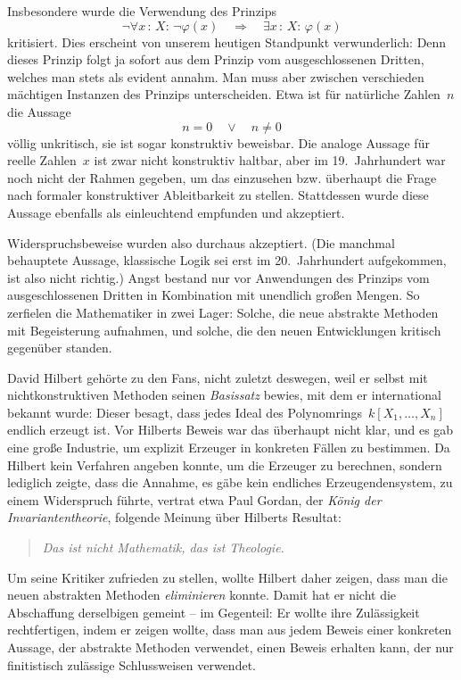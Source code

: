 \documentclass[a4paper,ngerman,12pt]{scrartcl}
\theoremstyle{definition}
\theoremstyle{plain}
\theoremstyle{remark}
\renewcommand{\_}{\mathpunct{.}\,}
\newcommand{\?}{\,{:}\,}
\begin{document}
Insbesondere wurde die Verwendung des Prinzips
\[ \neg\forall x\?X{:}\, \neg\varphi(x) \quad\Longrightarrow\quad
  \exists x\?X{:}\, \varphi(x) \]
kritisiert. Dies erscheint von unserem heutigen Standpunkt verwunderlich: Denn
dieses Prinzip folgt ja sofort aus dem Prinzip vom ausgeschlossenen Dritten,
welches man stets als evident annahm. Man muss aber zwischen verschieden
mächtigen Instanzen des Prinzips unterscheiden. Etwa ist für natürliche
Zahlen~$n$ die Aussage
\[ n = 0 \quad\vee\quad n \neq 0 \]
völlig unkritisch, sie ist sogar konstruktiv beweisbar. Die analoge Aussage für
reelle Zahlen~$x$ ist zwar nicht konstruktiv haltbar, aber im 19.~Jahrhundert
war noch nicht der Rahmen gegeben, um das einzusehen bzw. überhaupt die Frage
nach formaler konstruktiver Ableitbarkeit zu stellen. Stattdessen wurde diese
Aussage ebenfalls als einleuchtend empfunden und akzeptiert.

Widerspruchsbeweise wurden also durchaus akzeptiert. (Die manchmal behauptete
Aussage, klassische Logik sei erst im 20.~Jahrhundert aufgekommen, ist also
nicht richtig.) Angst bestand nur vor Anwendungen des Prinzips vom
ausgeschlossenen Dritten in Kombination mit unendlich großen Mengen. So
zerfielen die Mathematiker in zwei Lager: Solche, die neue abstrakte Methoden
mit Begeisterung aufnahmen, und solche, die den neuen Entwicklungen kritisch
gegenüber standen.

David Hilbert gehörte zu den Fans, nicht zuletzt deswegen, weil er selbst mit
nichtkonstruktiven Methoden seinen \emph{Basissatz} bewies, mit dem er
international bekannt wurde: Dieser besagt, dass jedes Ideal des
Polynomrings~$k[X_1,\ldots,X_n]$ endlich erzeugt ist. Vor Hilberts Beweis war
das überhaupt nicht klar, und es gab eine große Industrie, um explizit Erzeuger in
konkreten Fällen zu bestimmen. Da Hilbert kein Verfahren angeben konnte,
um die Erzeuger zu berechnen, sondern lediglich zeigte, dass die Annahme,
es gäbe kein endliches Erzeugendensystem, zu einem Widerspruch führte, vertrat
etwa Paul Gordan, der \emph{König der
Invariantentheorie}, folgende Meinung über Hilberts Resultat:
\begin{quote}
\emph{Das ist nicht Mathematik, das ist Theologie.}
\end{quote}

Um seine Kritiker zufrieden zu stellen, wollte Hilbert daher zeigen, dass man
die neuen abstrakten Methoden \emph{eliminieren} konnte. Damit hat er nicht die
Abschaffung derselbigen gemeint -- im Gegenteil: Er wollte ihre Zulässigkeit
rechtfertigen, indem er zeigen wollte, dass man aus jedem Beweis einer
konkreten Aussage, der abstrakte Methoden verwendet, einen Beweis erhalten
kann, der nur finitistisch zulässige Schlussweisen verwendet.
\end{document}
